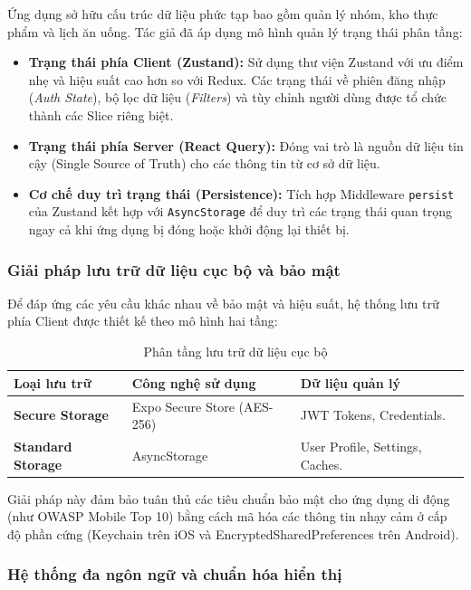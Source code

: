 Ứng dụng sở hữu cấu trúc dữ liệu phức tạp bao gồm quản lý nhóm, kho thực phẩm và lịch ăn uống. Tác giả đã áp dụng mô hình quản lý trạng thái phân tầng:

\begin{itemize}
    \item \textbf{Trạng thái phía Client (Zustand):} Sử dụng thư viện Zustand với ưu điểm nhẹ và hiệu suất cao hơn so với Redux. Các trạng thái về phiên đăng nhập (\textit{Auth State}), bộ lọc dữ liệu (\textit{Filters}) và tùy chỉnh người dùng được tổ chức thành các Slice riêng biệt.
    \item \textbf{Trạng thái phía Server (React Query):} Đóng vai trò là nguồn dữ liệu tin cậy (Single Source of Truth) cho các thông tin từ cơ sở dữ liệu.
    \item \textbf{Cơ chế duy trì trạng thái (Persistence):} Tích hợp Middleware \texttt{persist} của Zustand kết hợp với \texttt{AsyncStorage} để duy trì các trạng thái quan trọng ngay cả khi ứng dụng bị đóng hoặc khởi động lại thiết bị.
\end{itemize}

\subsubsection{Giải pháp lưu trữ dữ liệu cục bộ và bảo mật}

Để đáp ứng các yêu cầu khác nhau về bảo mật và hiệu suất, hệ thống lưu trữ phía Client được thiết kế theo mô hình hai tầng:

\begin{table}[ht]
\centering
\begin{tabular}{|l|l|l|}
\hline
\textbf{Loại lưu trữ} & \textbf{Công nghệ sử dụng} & \textbf{Dữ liệu quản lý} \\ \hline
\textbf{Secure Storage} & Expo Secure Store (AES-256) & JWT Tokens, Credentials. \\ \hline
\textbf{Standard Storage} & AsyncStorage & User Profile, Settings, Caches. \\ \hline
\end{tabular}
\caption{Phân tầng lưu trữ dữ liệu cục bộ}
\end{table}

Giải pháp này đảm bảo tuân thủ các tiêu chuẩn bảo mật cho ứng dụng di động (như OWASP Mobile Top 10) bằng cách mã hóa các thông tin nhạy cảm ở cấp độ phần cứng (Keychain trên iOS và EncryptedSharedPreferences trên Android).

\subsubsection{Hệ thống đa ngôn ngữ và chuẩn hóa hiển thị}

